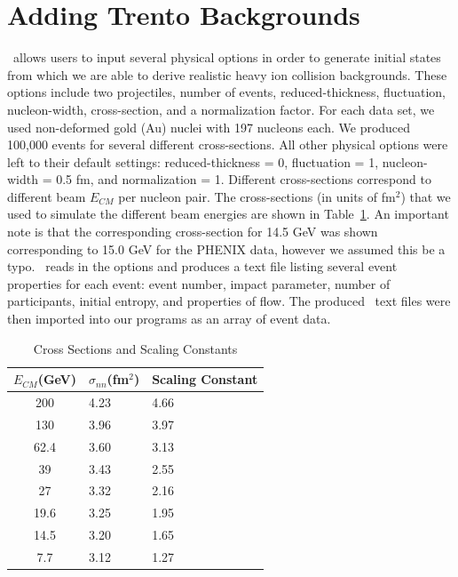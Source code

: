 \documentclass[11pt]{article}
\begin{document}
\section{Adding Trento Backgrounds}
%
%
\trento\ allows users to input several physical options in order to generate initial states from which we are able to derive realistic heavy ion collision backgrounds. These options include two projectiles, number of events, reduced-thickness, fluctuation, nucleon-width, cross-section, and a normalization factor. For each data set,  we used non-deformed gold (Au) nuclei with 197 nucleons each. We produced 100,000 events for several different cross-sections. All other physical options were left to their default settings: reduced-thickness = 0, fluctuation = 1, nucleon-width = 0.5 fm, and normalization = 1. Different cross-sections correspond to different beam $E_{CM}$ per nucleon pair. The cross-sections (in units of fm$^2$) that we used to simulate the different beam energies are shown in Table~\ref{tab_phenix_trento}.  An important note is that the corresponding cross-section for 14.5 GeV was shown corresponding to 15.0 GeV for the PHENIX data, however we assumed this be a typo. \trento\ reads in the options and produces a text file listing several event properties for each event: event number, impact parameter, number of participants, initial entropy, and properties of flow. The produced \trento\ text files were then imported into our programs as an array of event data.
%
\begin{table}[th]
\begin{center}
\caption{Cross Sections and Scaling Constants}
\label{tab_phenix_trento}
\begin{tabular}{|c|l|l|}
\hline
$E_{CM}$(GeV) & $\sigma_{nn}$(fm$^2$) & Scaling Constant \\
\hline
200 & 4.23 & 4.66 \\
\hline
130 & 3.96 & 3.97 \\
\hline
62.4 & 3.60 & 3.13 \\
\hline
39 & 3.43 & 2.55 \\
\hline
27 & 3.32 & 2.16 \\
\hline
19.6 & 3.25 & 1.95 \\
\hline
14.5 & 3.20 & 1.65 \\
\hline
7.7 & 3.12 & 1.27 \\
\hline
\end{tabular}
\end{center}
\end{table}
\end{document}
